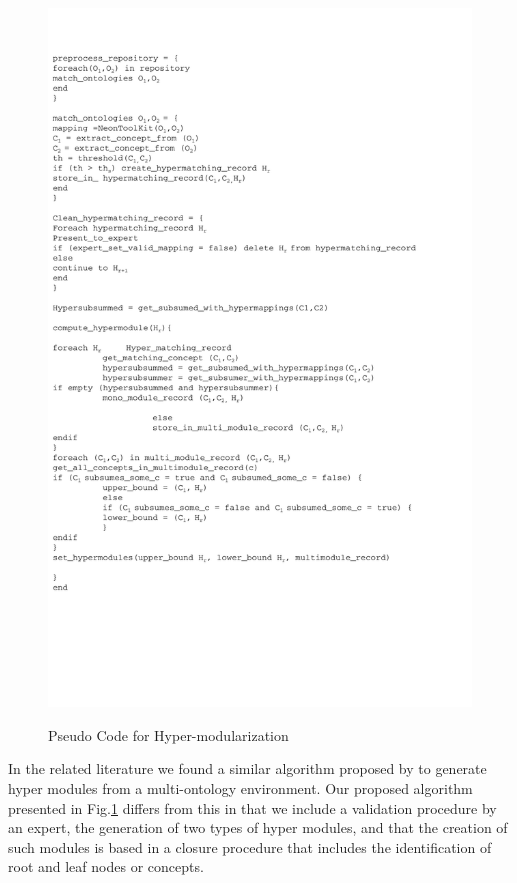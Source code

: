 \begin{figure}
\vspace{-40}
\begin{center}
	\includegraphics[scale=0.7]{figure-chapterIV/fig4-15.pdf}\\
	\vspace{-80}
	\caption{Pseudo Code for Hyper-modularization}
	
	\label{figure4-15}
\end{center}
\end{figure}




In the related literature we found a similar algorithm proposed by \cite{oliver_kutz_chinese_2010} to generate hyper modules from a multi-ontology environment. Our proposed algorithm presented in Fig.\ref{figure4-15} differs from this in that we include a validation procedure by an expert, the generation of two types of hyper modules, and that the creation of such modules is based in a closure procedure that includes the identification of root and leaf nodes or concepts. 

